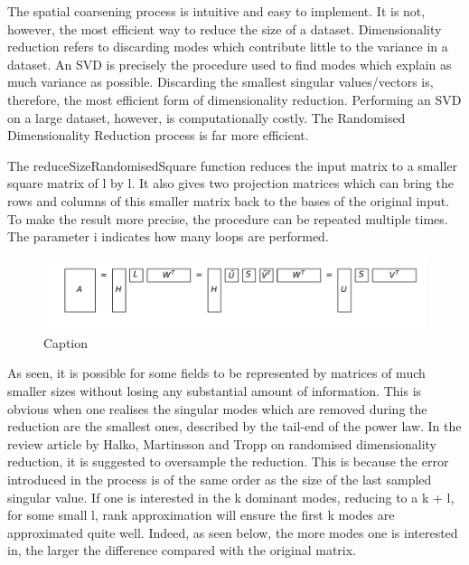\documentclass{acm_proc_article-sp}
\begin{document}
The spatial coarsening process is intuitive and easy to implement. It is not, however, the most efficient way to reduce the size of a dataset. Dimensionality reduction refers to discarding modes which contribute little to the variance in a dataset. An SVD is precisely the procedure used to find modes which explain as much variance as possible. Discarding the smallest singular values/vectors is, therefore, the most efficient form of dimensionality reduction. Performing an SVD on a large dataset, however, is computationally costly. The Randomised Dimensionality Reduction process is far more efficient.

The reduceSizeRandomisedSquare function reduces the input matrix to a smaller square matrix of l by l. It also gives two projection matrices which can bring the rows and columns of this smaller matrix back to the bases of the original input. To make the result more precise, the procedure can be repeated multiple times. The parameter i indicates how many loops are performed.

\begin{figure}[h]
\begin{center}
\includegraphics[scale=0.3]{Results/reduceSizeRandomisedSquare.pdf}
\caption[Small caption]{Caption}
\label{fig:reduceSizeRandomisedSquare}
\end{center}
\end{figure}

As seen, it is possible for some fields to be represented by matrices of much smaller sizes without losing any substantial amount of information. This is obvious when one realises the singular modes which are removed during the reduction are the smallest ones, described by the tail-end of the power law. In the review article by Halko, Martinsson and Tropp on randomised dimensionality reduction, it is suggested to oversample the reduction. This is because the error introduced in the process is of the same order as the size of the last sampled singular value. If one is interested in the k dominant modes, reducing to a k + l, for some small l, rank approximation will ensure the first k modes are approximated quite well. Indeed, as seen below, the more modes one is interested in, the larger the difference compared with the original matrix.
\end{document}
